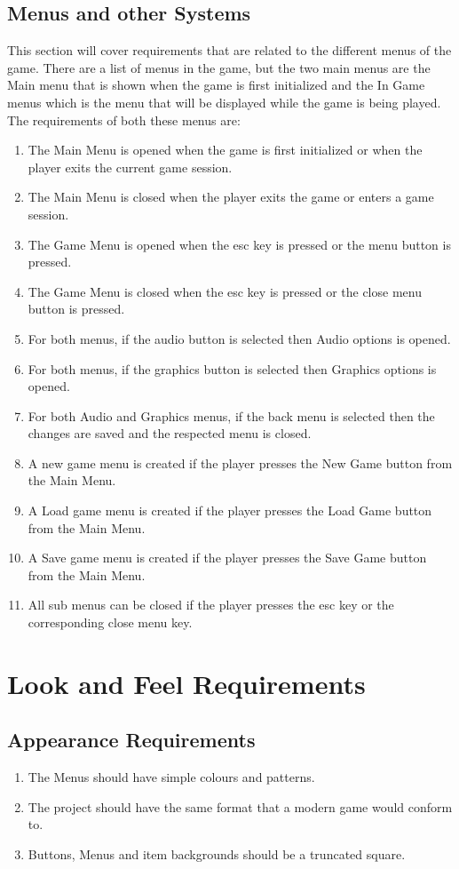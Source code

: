 \documentclass{article}
\begin{document}
\subsection{Menus and other Systems}
\quad This section will cover requirements that are related to the different menus of the game. There are a list of menus in the game, but the two main menus are the Main menu that is shown when the game is first initialized and the In Game menus which is the menu that will be displayed while the game is being played. The requirements of both these menus are:
\begin{enumerate}[{MR}1. ]
	\item The Main Menu is opened when the game is first initialized or when the player exits the current game session.
	\item The Main Menu is closed when the player exits the game or enters a game session.
	\item The Game Menu is opened when the esc key is pressed or the menu button is pressed.
	\item The Game Menu is closed when the esc key is pressed or the close menu button is pressed.
	\item For both menus, if the audio button is selected then Audio options is opened.
	\item For both menus, if the graphics button is selected then Graphics options is opened.
	\item For both Audio and Graphics menus, if the back menu is selected then the changes are saved and the respected menu is closed.
	\item A new game menu is created if the player presses the New Game button from the Main Menu.
	\item A Load game menu is created if the player presses the Load Game button from the Main Menu.
	\item A Save game menu is created if the player presses the Save Game button from the Main Menu.
	\item All sub menus can be closed if the player presses the esc key or the corresponding close menu key.	
\end{enumerate}
\section{Look and Feel Requirements}
\subsection{Appearance Requirements}
\begin{enumerate}[{APPR}1. ]
	\item The Menus should have simple colours and patterns.
	\item The project should have the same format that a modern game would conform to.
	\item Buttons, Menus and item backgrounds should be a truncated square. 
\end{enumerate}
\end{document}
